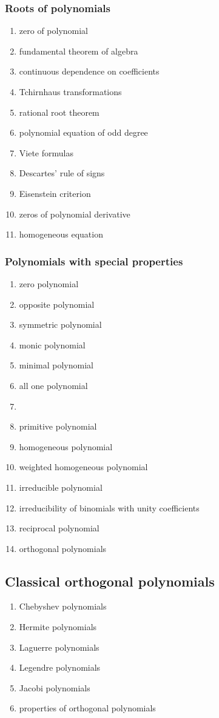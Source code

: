 \documentclass[12pt]{article}
\begin{document}
\subsubsection*{Roots of polynomials}
\begin{enumerate}
\item zero of polynomial
\item fundamental theorem of algebra
\item continuous dependence on coefficients
\item Tchirnhaus transformations
\item rational root theorem  
\item polynomial equation of odd degree
\item Viete formulas
\item Descartes' rule of signs
\item Eisenstein criterion 
\item zeros of polynomial derivative
\item homogeneous equation
\end{enumerate}

\subsubsection*{Polynomials with special properties}
\begin{enumerate}
\item zero polynomial
\item opposite polynomial
\item symmetric polynomial
\item monic polynomial
\item minimal polynomial
\item all one polynomial
\item {}
\item primitive polynomial
\item homogeneous polynomial
\item weighted homogeneous polynomial
\item irreducible polynomial
\item irreducibility of binomials with unity coefficients
\item reciprocal polynomial
\item orthogonal polynomials
\end{enumerate}


\subsection*{Classical orthogonal polynomials}
\begin{enumerate}
\item Chebyshev polynomials
\item Hermite polynomials
\item Laguerre polynomials
\item Legendre polynomials
\item Jacobi polynomials
\item properties of orthogonal polynomials
\end{enumerate}
\end{document}
